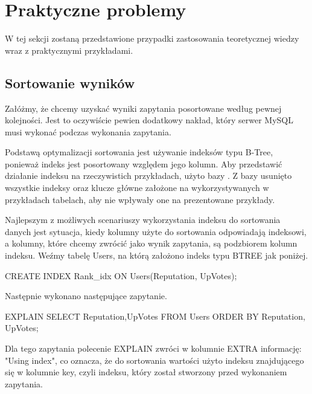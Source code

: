 \section{Praktyczne problemy}
W tej sekcji zostaną przedstawione przypadki zastosowania teoretycznej wiedzy wraz z praktycznymi przykładami.



\subsection{Sortowanie wyników}
Załóżmy, że chcemy uzyskać wyniki zapytania posortowane według pewnej kolejności. Jest to oczywiście pewien dodatkowy nakład, który serwer MySQL musi wykonać podczas wykonania zapytania.

Podstawą optymalizacji sortowania jest używanie indeksów typu B-Tree, ponieważ indeks jest posortowany względem jego kolumn. Aby przedstawić działanie indeksu na rzeczywistich przykładach, użyto bazy . Z bazy usunięto wszystkie indeksy oraz klucze główne założone na wykorzystywanych w przykładach tabelach, aby nie wpływały one na prezentowane przykłady.


Najlepszym z możliwych scenariuszy wykorzystania indeksu do sortowania danych jest sytuacja, kiedy kolumny użyte do sortowania odpowiadają indeksowi, a kolumny, które chcemy zwrócić jako wynik zapytania, są podzbiorem kolumn indeksu.
Weźmy tabelę Users, na którą założono indeks typu BTREE jak poniżej.

\begin{spverbatim}
	CREATE INDEX Rank_idx ON Users(Reputation, UpVotes);
\end{spverbatim}
Następnie wykonano następujące zapytanie.
\begin{spverbatim}
	EXPLAIN SELECT Reputation,UpVotes FROM Users ORDER BY Reputation, UpVotes;
\end{spverbatim}
Dla tego zapytania polecenie EXPLAIN zwróci w kolumnie EXTRA informację: "Using index", co oznacza, że do sortowania wartości użyto indeksu znajdującego się w kolumnie key, czyli indeksu, który został stworzony przed wykonaniem zapytania.


